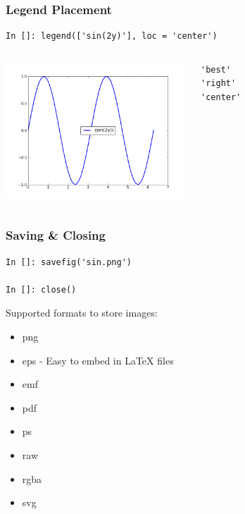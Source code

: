 \documentclass[14pt,compress]{beamer}
\newcommand{\emphbar}[1]
{\begin{beamercolorbox}[rounded=true]{emphbar} 
      {#1}
 \end{beamercolorbox}
}
\newcounter{time}
\newcommand{\inctime}[1]{\addtocounter{time}{#1}{\tiny \thetime\ m}}
\begin{document}
\begin{frame}[fragile]
\frametitle{Legend Placement}
\begin{block}{}
    \small
\begin{lstlisting}
In []: legend(['sin(2y)'], loc = 'center')
\end{lstlisting}
\end{block}

\begin{columns}
 \includegraphics[height=2in, interpolate=true]{data/position}  
\vspace{-0.2in}
\begin{lstlisting}
'best' 
'right'
'center'
\end{lstlisting}
\end{columns}
\end{frame}


\begin{frame}[fragile]
\frametitle{Saving \& Closing}
\begin{lstlisting}
In []: savefig('sin.png')

In []: close()
\end{lstlisting}
Supported formats to store images:
\begin{itemize}
\item png
\item eps - Easy to embed in LaTeX files
\item emf
\item pdf
\item ps
\item raw
\item rgba
\item svg
\end{itemize}
\end{frame}
\end{document}
